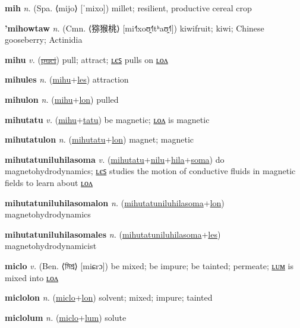 \textbf{\hypertarget{mih}{mih}} \textit{n.} (Spa. ⟨mijo⟩ [ˈmixo])
millet; resilient, productive cereal crop

\textbf{\hypertarget{'mihowtaw}{'mihowtaw}} \textit{n.} (Cmn. ⟨{\chinese{}猕猴桃}⟩ [mi˧˥xoʊ̯˧˥tʰaʊ̯˧˥])
kiwifruit; kiwi; Chinese gooseberry; Actinidia

\textbf{\hypertarget{mihu}{mihu}} \textit{v.} (\hyperlink{puci}{\sout{puci}})
pull; attract; \hyperlink{mihules}{ʟєꜱ} pulls on \hyperlink{mihulon}{ʟᴏᴧ}

\textbf{\hypertarget{mihules}{mihules}} \textit{n.} (\hyperlink{mihu}{mihu}+\allowbreak \hyperlink{les}{les})
attraction

\textbf{\hypertarget{mihulon}{mihulon}} \textit{n.} (\hyperlink{mihu}{mihu}+\allowbreak \hyperlink{lon}{lon})
pulled

\textbf{\hypertarget{mihutatu}{mihutatu}} \textit{v.} (\hyperlink{mihu}{mihu}+\allowbreak \hyperlink{tatu}{tatu})
be magnetic; \hyperlink{mihutatulon}{ʟᴏᴧ} is magnetic

\textbf{\hypertarget{mihutatulon}{mihutatulon}} \textit{n.} (\hyperlink{mihutatu}{mihutatu}+\allowbreak \hyperlink{lon}{lon})
magnet; magnetic

\textbf{\hypertarget{mihutatuniluhilasoma}{mihutatuniluhilasoma}} \textit{v.} (\hyperlink{mihutatu}{mihutatu}+\allowbreak \hyperlink{nilu}{nilu}+\allowbreak \hyperlink{hila}{hila}+\allowbreak \hyperlink{soma}{soma})
do magnetohydrodynamics; \hyperlink{mihutatuniluhilasomales}{ʟєꜱ} studies the motion of conductive fluids in magnetic fields to learn about \hyperlink{mihutatuniluhilasomalon}{ʟᴏᴧ}

\textbf{\hypertarget{mihutatuniluhilasomalon}{mihutatuniluhilasomalon}} \textit{n.} (\hyperlink{mihutatuniluhilasoma}{mihutatuniluhilasoma}+\allowbreak \hyperlink{lon}{lon})
magnetohydrodynamics

\textbf{\hypertarget{mihutatuniluhilasomales}{mihutatuniluhilasomales}} \textit{n.} (\hyperlink{mihutatuniluhilasoma}{mihutatuniluhilasoma}+\allowbreak \hyperlink{les}{les})
magnetohydrodynamicist

\textbf{\hypertarget{miclo}{miclo}} \textit{v.} (Ben. ⟨{\bengali{}মিশ্র}⟩ [miɕrɔ])
be mixed; be impure; be tainted; permeate; \hyperlink{miclolum}{ʟᴜᴍ} is mixed into \hyperlink{miclolon}{ʟᴏᴧ}

\textbf{\hypertarget{miclolon}{miclolon}} \textit{n.} (\hyperlink{miclo}{miclo}+\allowbreak \hyperlink{lon}{lon})
solvent; mixed; impure; tainted

\textbf{\hypertarget{miclolum}{miclolum}} \textit{n.} (\hyperlink{miclo}{miclo}+\allowbreak \hyperlink{lum}{lum})
solute

